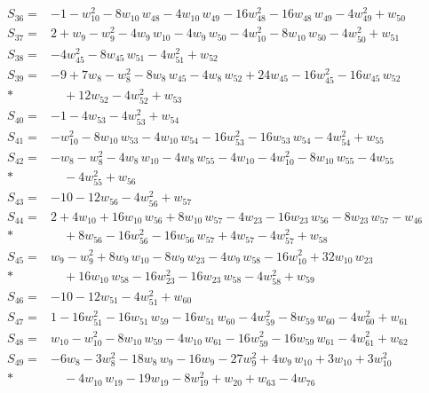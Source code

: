 \documentclass[11pt]{article}
\theoremstyle{remark}\newtheorem{remark}[theorem]{Remark}
\begin{document}
\begin{align*}
S_{36}={}& -1 - w_{10}^{2} - 8w_{10}\,w_{48} - 4w_{10}\,w_{49} - 16w_{48}^{2} - 16w_{48}\,w_{49} - 4w_{49}^{2} + w_{50} \\[2pt]
S_{37}={}& 2 + w_{9} - w_{9}^{2} - 4w_{9}\,w_{10} - 4w_{9}\,w_{50} - 4w_{10}^{2} - 8w_{10}\,w_{50} - 4w_{50}^{2} + w_{51} \\[2pt]
S_{38}={}& -4w_{45}^{2} - 8w_{45}\,w_{51} - 4w_{51}^{2} + w_{52} \\[2pt]
S_{39}={}& -9 + 7w_{8} - w_{8}^{2} - 8w_{8}\,w_{45} - 4w_{8}\,w_{52} + 24w_{45} - 16w_{45}^{2} - 16w_{45}\,w_{52} \\*
&\quad  + 12w_{52} - 4w_{52}^{2} + w_{53} \\[2pt]
S_{40}={}& -1 - 4w_{53} - 4w_{53}^{2} + w_{54} \\[2pt]
S_{41}={}& -w_{10}^{2} - 8w_{10}\,w_{53} - 4w_{10}\,w_{54} - 16w_{53}^{2} - 16w_{53}\,w_{54} - 4w_{54}^{2} + w_{55} \\[2pt]
S_{42}={}& -w_{8} - w_{8}^{2} - 4w_{8}\,w_{10} - 4w_{8}\,w_{55} - 4w_{10} - 4w_{10}^{2} - 8w_{10}\,w_{55} - 4w_{55} \\*
&\quad  - 4w_{55}^{2} + w_{56} \\[2pt]
S_{43}={}& -10 - 12w_{56} - 4w_{56}^{2} + w_{57} \\[2pt]
S_{44}={}& 2 + 4w_{10} + 16w_{10}\,w_{56} + 8w_{10}\,w_{57} - 4w_{23} - 16w_{23}\,w_{56} - 8w_{23}\,w_{57} - w_{46} \\*
&\quad  + 8w_{56} - 16w_{56}^{2} - 16w_{56}\,w_{57} + 4w_{57} - 4w_{57}^{2} + w_{58} \\[2pt]
S_{45}={}& w_{9} - w_{9}^{2} + 8w_{9}\,w_{10} - 8w_{9}\,w_{23} - 4w_{9}\,w_{58} - 16w_{10}^{2} + 32w_{10}\,w_{23} \\*
&\quad  + 16w_{10}\,w_{58} - 16w_{23}^{2} - 16w_{23}\,w_{58} - 4w_{58}^{2} + w_{59} \\[2pt]
S_{46}={}& -10 - 12w_{51} - 4w_{51}^{2} + w_{60} \\[2pt]
S_{47}={}& 1 - 16w_{51}^{2} - 16w_{51}\,w_{59} - 16w_{51}\,w_{60} - 4w_{59}^{2} - 8w_{59}\,w_{60} - 4w_{60}^{2} + w_{61} \\[2pt]
S_{48}={}& w_{10} - w_{10}^{2} - 8w_{10}\,w_{59} - 4w_{10}\,w_{61} - 16w_{59}^{2} - 16w_{59}\,w_{61} - 4w_{61}^{2} + w_{62} \\[2pt]
S_{49}={}& -6w_{8} - 3w_{8}^{2} - 18w_{8}\,w_{9} - 16w_{9} - 27w_{9}^{2} + 4w_{9}\,w_{10} + 3w_{10} + 3w_{10}^{2} \\*
&\quad  - 4w_{10}\,w_{19} - 19w_{19} - 8w_{19}^{2} + w_{20} + w_{63} - 4w_{76} \\[2pt]

\end{align*}
\end{document}
